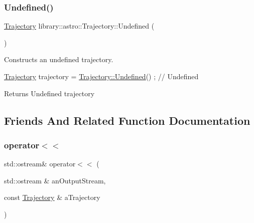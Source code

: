 \subsubsection{\texorpdfstring{Undefined()}{Undefined()}}
{\footnotesize\ttfamily \hyperlink{classlibrary_1_1astro_1_1_trajectory}{Trajectory} library\+::astro\+::\+Trajectory\+::\+Undefined (\begin{DoxyParamCaption}{ }\end{DoxyParamCaption})\hspace{0.3cm}{\ttfamily [static]}}



Constructs an undefined trajectory. 


\begin{DoxyCode}
\hyperlink{classlibrary_1_1astro_1_1_trajectory_a8e5c7740915ca947e067c0f419ac1c65}{Trajectory} trajectory = \hyperlink{classlibrary_1_1astro_1_1_trajectory_a0a8685cabc646fcc5b7f046a606ae967}{Trajectory::Undefined}() ; \textcolor{comment}{// Undefined}
\end{DoxyCode}


\begin{DoxyReturn}{Returns}
Undefined trajectory 
\end{DoxyReturn}


\subsection{Friends And Related Function Documentation}
\mbox{\label{classlibrary_1_1astro_1_1_trajectory_aef0327f0240dc2d71eca34dc287f88ea}} 
\subsubsection{\texorpdfstring{operator$<$$<$}{operator<<}}
{\footnotesize\ttfamily std\+::ostream\& operator$<$$<$ (\begin{DoxyParamCaption}\item[{std\+::ostream \&}]{an\+Output\+Stream,  }\item[{const \hyperlink{classlibrary_1_1astro_1_1_trajectory}{Trajectory} \&}]{a\+Trajectory }\end{DoxyParamCaption})\hspace{0.3cm}{\ttfamily [friend]}}



